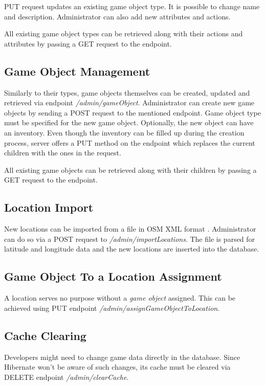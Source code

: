 	PUT request updates an existing game object type. It is possible to change name and description. Administrator can also add new attributes and actions. 
		
	All existing game object types can be retrieved along with their actions and attributes by passing a GET request to the endpoint.
	
	\subsection{Game Object Management}
	Similarly to their types, game objects themselves can be created, updated and retrieved via endpoint \textit{/admin/gameObject}. Administrator can create new game objects by sending a POST request to the mentioned endpoint. Game object type must be specified for the new game object. Optionally, the new object can have an inventory. Even though the inventory can be filled up during the creation process, server offers a PUT method on the endpoint which replaces the current children with the ones in the request.
	
	All existing game objects can be retrieved along with their children by passing a GET request to the endpoint.
	
	\subsection{Location Import}
	New locations can be imported from a file in OSM XML format \cite{osmxml}. Administrator can do so via a POST request to \textit{/admin/importLocations}. The file is parsed for latitude and longitude data and the new locations are inserted into the database.
	
	\subsection{Game Object To a Location Assignment}
	A location serves no purpose without a \textit{game object} assigned. This can be achieved using PUT endpoint 
	\textit{/admin/assignGameObjectToLocation}.
	
	\subsection{Cache Clearing}
	Developers might need to change game data directly in the database. Since Hibernate won't be aware of such changes, its cache must be cleared via DELETE endpoint \textit{/admin/clearCache}.
	
